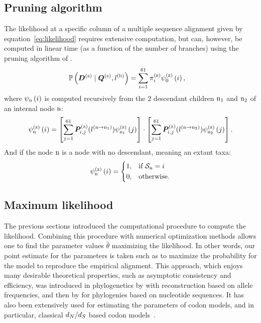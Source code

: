 \subsection{Pruning algorithm}
\label{subsec:pruning-algorithm}
The likelihood at a specific column of a multiple sequence alignment given by equation~\ref{eq:likelihood} requires extensive computation, but can, however, be computed in linear time (as a function of the number of branches) using the pruning algorithm of \citet{Felsenstein1981}.
\begin{align}
    \mathbb{P} \left(\bm{D}^{(\text{z})} \mid \bm{Q}^{(\text{z})}, l^{(\text{b})} \right) & = \sum\limits_{{i}=1}^{61} \pi^{(\text{z})}_{{i}} \psi^{(\text{z})}_{0} \left( {i} \right),
\end{align}
where $\psi_{\text{n}} \left( {i} \right)$ is computed recursively from the $2$ descendant children $\text{n}_{1}$ and $\text{n}_{2}$ of an internal node $\text{n}$:
\begin{align}
    \psi^{(\text{z})}_{\text{n}} \left( {i} \right) =
    \left[ \sum\limits_{{j}=1}^{61}\bm{P}^{(\text{z})}_{{i}, {j}}(l^{(\text{n} \to \text{n}_{1})}) \psi^{(\text{z})}_{\text{n}_{1}} \left( {j} \right) \right]
    \cdot
    \left[ \sum\limits_{{j}=1}^{61}\bm{P}^{(\text{z})}_{{i}, {j}}(l^{(\text{n} \to \text{n}_{2})}) \psi^{(\text{z})}_{\text{n}_{2}} \left( {j} \right) \right].
\end{align}
And if the node $\text{n}$ is a node with no descendant, meaning an extant taxa:
\begin{align}
    \psi^{(\text{z})}_{\text{n}} \left( {i} \right) =
    \begin{dcases}
        1, & \text{if } \mathcal{S}_{\text{n}} = {i} \\
        0, & \text{otherwise.}
    \end{dcases}
\end{align}

\subsection{Maximum likelihood}
\label{subsec:maximum-likelihood}

The previous sections introduced the computational procedure to compute the likelihood.
Combining this procedure with numerical optimization methods allows one to find the parameter values $\widehat{\theta}$ maximizing the likelihood.
In other words, our point estimate for the parameters is taken such as to maximize the probability for the model to reproduce the empirical alignment.
This approach, which enjoys many desirable theoretical properties, such as asymptotic consistency and efficiency, was introduced in phylogenetics by \citet{Cavalli-Sforza1967} with reconstruction based on allele frequencies, and then by \citet{Felsenstein1981} for phylogenies based on nucleotide sequences.
It has also been extensively used for estimating the parameters of codon models, and in particular, classical $d_N / d_S$ based codon models~\citep{Yang1997a,Pond2005,Dutheil2006,Yang2007,Gueguen2013,KosakovskyPond2020}.


